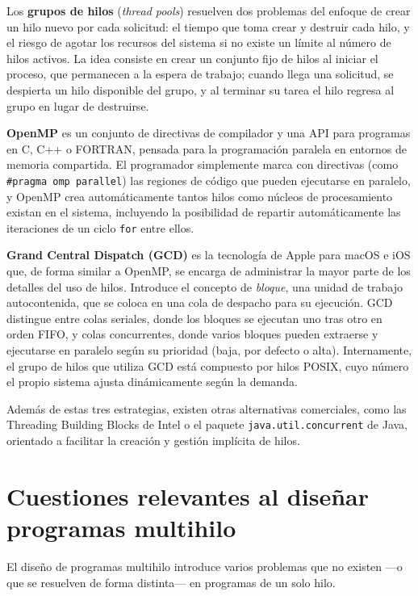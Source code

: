 \documentclass[12pt,letterpaper]{article}
\begin{document}
Los \textbf{grupos de hilos} (\textit{thread pools}) resuelven dos problemas del enfoque de crear un hilo nuevo por cada solicitud: el tiempo que toma crear y destruir cada hilo, y el riesgo de agotar los recursos del sistema si no existe un límite al número de hilos activos. La idea consiste en crear un conjunto fijo de hilos al iniciar el proceso, que permanecen a la espera de trabajo; cuando llega una solicitud, se despierta un hilo disponible del grupo, y al terminar su tarea el hilo regresa al grupo en lugar de destruirse.

\textbf{OpenMP} es un conjunto de directivas de compilador y una API para programas en C, C++ o FORTRAN, pensada para la programación paralela en entornos de memoria compartida. El programador simplemente marca con directivas (como \texttt{\#pragma omp parallel}) las regiones de código que pueden ejecutarse en paralelo, y OpenMP crea automáticamente tantos hilos como núcleos de procesamiento existan en el sistema, incluyendo la posibilidad de repartir automáticamente las iteraciones de un ciclo \texttt{for} entre ellos.

\textbf{Grand Central Dispatch (GCD)} es la tecnología de Apple para macOS e iOS que, de forma similar a OpenMP, se encarga de administrar la mayor parte de los detalles del uso de hilos. Introduce el concepto de \textit{bloque}, una unidad de trabajo autocontenida, que se coloca en una cola de despacho para su ejecución. GCD distingue entre colas seriales, donde los bloques se ejecutan uno tras otro en orden FIFO, y colas concurrentes, donde varios bloques pueden extraerse y ejecutarse en paralelo según su prioridad (baja, por defecto o alta). Internamente, el grupo de hilos que utiliza GCD está compuesto por hilos POSIX, cuyo número el propio sistema ajusta dinámicamente según la demanda.

Además de estas tres estrategias, existen otras alternativas comerciales, como las Threading Building Blocks de Intel o el paquete \texttt{java.util.concurrent} de Java, orientado a facilitar la creación y gestión implícita de hilos.

\section{Cuestiones relevantes al diseñar programas multihilo}

El diseño de programas multihilo introduce varios problemas que no existen —o que se resuelven de forma distinta— en programas de un solo hilo.
\end{document}
